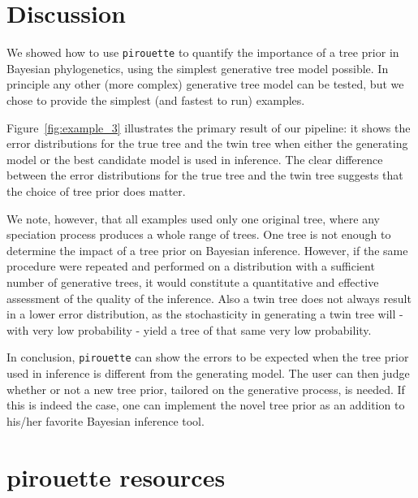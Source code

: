 \section{Discussion}

We showed how to use \verb;pirouette; to quantify the importance of a 
tree prior in Bayesian phylogenetics, using the simplest generative tree 
model possible.
In principle any other (more complex) generative tree model can be tested, 
but we chose to provide the simplest (and fastest to run) examples.

Figure~\ref{fig:example_3} illustrates the primary result of our pipeline: 
it shows the error distributions for the true tree and the twin tree 
when either the generating model or the best candidate model is used in inference. 
The clear difference between the error distributions 
for the true tree and the twin tree suggests 
that the choice of tree prior does matter.

We note, however, that all examples used only one original tree,
where any speciation process produces a whole range of trees.
One tree is not enough to determine the impact 
of a tree prior on Bayesian inference.
However, if the same procedure were repeated and 
performed on a distribution with a sufficient number of generative trees, 
it would constitute a quantitative and effective assessment of the 
quality of the inference.
Also a twin tree does not always result in a lower error distribution,
as the stochasticity in generating a twin tree will - with
very low probability - yield a tree of that same very low probability.

In conclusion, \verb;pirouette; can show the errors to be expected
when the tree prior used in inference is different from the generating model.
The user can then judge whether or not a new tree prior, 
tailored on the generative process, is needed. 
If this is indeed the case, one can implement the novel tree prior as an addition to 
his/her favorite Bayesian inference tool.

\section{pirouette resources}

